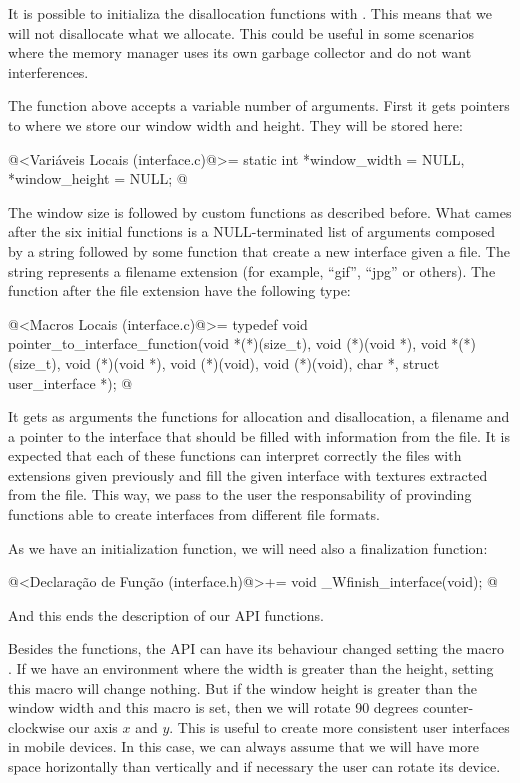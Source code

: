 It is possible to initializa the disallocation functions with
. This means that we will not disallocate what we
allocate. This could be useful in some scenarios where the memory
manager uses its own garbage collector and do not want interferences.

The function above accepts a variable number of arguments. First it
gets pointers to where we store our window width and height. They will
be stored here:

\iniciocodigo
@<Variáveis Locais (interface.c)@>=
static int *window_width = NULL, *window_height = NULL;
@
\fimcodigo

The window size is followed by custom functions as described before.
What cames after the six initial functions is a NULL-terminated list
of arguments composed by a string followed by some function that
create a new interface given a file. The string represents a filename
extension (for example, ``gif'', ``jpg'' or others). The function
after the file extension have the following type:

\iniciocodigo
@<Macros Locais (interface.c)@>=
typedef void pointer_to_interface_function(void *(*)(size_t), void (*)(void *),
                                          void *(*)(size_t), void (*)(void *),
                                          void (*)(void), void (*)(void),
                                          char *, struct user_interface *);
@
\fimcodigo


It gets as arguments the functions for allocation and disallocation, a
filename and a pointer to the interface that should be filled with
information from the file. It is expected that each of these functions
can interpret correctly the files with extensions given previously and
fill the given interface with textures extracted from the file. This
way, we pass to the user the responsability of provinding functions
able to create interfaces from different file formats.

As we have an initialization function, we will need also a
finalization function:

\iniciocodigo
@<Declaração de Função (interface.h)@>+=
void _Wfinish_interface(void);
@
\fimcodigo

And this ends the description of our API functions.

Besides the functions, the API can have its behaviour changed setting
the macro . If we have an environment
where the width is greater than the height, setting this macro will
change nothing. But if the window height is greater than the window
width and this macro is set, then we will rotate 90 degrees
counter-clockwise our axis $x$ and $y$. This is useful to create more
consistent user interfaces in mobile devices. In this case, we can
always assume that we will have more space horizontally than
vertically and if necessary the user can rotate its device.


